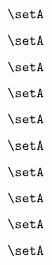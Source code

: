 \begin{forslides}
       \begin{equation}
        \label{eq:combination-180}
        \setA
    \end{equation}
       
     \begin{equation}
        \label{eq:combination-181}
        \setA
    \end{equation}
    
     \begin{equation}
        \label{eq:combination-182}
        \setA
    \end{equation}
    
    \begin{equation}
        \label{eq:combination-183}
        \setA
    \end{equation}
    
     \begin{equation}
        \label{eq:combination-184}
        \setA
    \end{equation}
    
     \begin{equation}
        \label{eq:combination-185}
        \setA
    \end{equation}
    
    \begin{equation}
        \label{eq:combination-186}
        \setA
    \end{equation}
    
     \begin{equation}
        \label{eq:combination-187}
        \setA
    \end{equation}
    
     \begin{equation}
        \label{eq:combination-188}
        \setA
    \end{equation}
    
    \begin{equation}
        \label{eq:combination-189}
       \setA
    \end{equation}

    

    



\end{forslides}